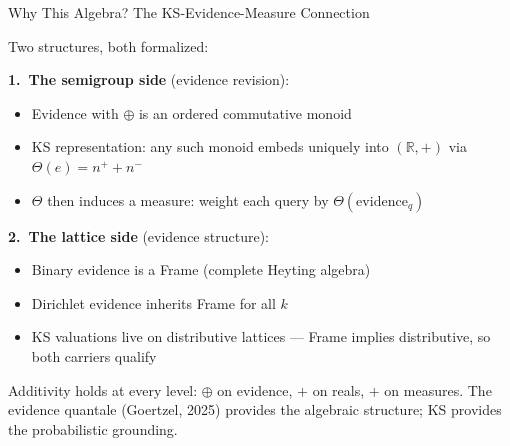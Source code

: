 \documentclass[aspectratio=169,11pt]{beamer}
\begin{document}
\begin{frame}{Why This Algebra? The KS-Evidence-Measure Connection}

Two structures, both formalized:

\medskip
\textbf{1.\ The semigroup side} (evidence revision):
\begin{itemize}
\item Evidence with $\oplus$ is an ordered commutative monoid
\item KS representation: any such monoid embeds
  \alert{uniquely} into $(\mathbb{R}, +)$ via
  $\Theta(e) = n^+ + n^-$
\item $\Theta$ then induces a measure: weight each query by
  $\Theta(\mathrm{evidence}_q)$
\end{itemize}

\medskip
\textbf{2.\ The lattice side} (evidence structure):
\begin{itemize}
\item Binary evidence is a Frame (complete Heyting algebra)
\item Dirichlet evidence inherits Frame for all $k$
\item KS valuations live on \alert{distributive lattices}
  --- Frame implies distributive, so both carriers qualify
\end{itemize}

\medskip
\alert{Additivity holds at every level}: $\oplus$ on evidence,
$+$ on reals, $+$ on measures.  The evidence quantale
(Goertzel, 2025) provides the algebraic structure;
KS provides the probabilistic grounding.

\end{frame}
\end{document}
